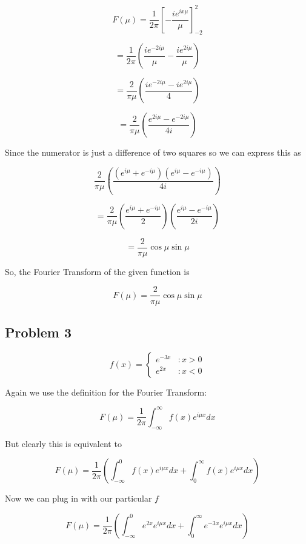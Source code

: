 \documentclass[12pt]{article}
\begin{document}
$$F(\mu)=\frac{1}{2\pi}\left[-\frac{i e^{i x \mu }}{\mu}\right]_{-2}^2$$

$$=\frac{1}{2\pi}\left(\frac{i e^{-2 i \mu }}{\mu }-\frac{i e^{2 i \mu }}{\mu }\right)$$

$$=\frac{2}{\pi\mu}\left(\frac{i e^{-2 i \mu }-i e^{2 i \mu }}{4 }\right)$$

$$=\frac{2}{\pi\mu}\left(\frac{e^{2 i \mu }- e^{-2 i \mu } }{4 i }\right)$$

Since the numerator is just a difference of two squares so we can express this as

$$\frac{2}{\pi\mu}\left(\frac{(e^{ i \mu }+ e^{- i \mu })(e^{ i \mu }- e^{- i \mu }) }{4 i }\right)$$

$$=\frac{2}{\pi\mu}\left(\frac{e^{ i \mu }+ e^{- i \mu }}{2 }\right)\left(\frac{e^{ i \mu }- e^{- i \mu } }{2i }\right)$$

$$=\frac{2}{\pi\mu}\cos{\mu}\sin{\mu}$$

So, the Fourier Transform of the given function is

$$F(\mu)=\frac{2}{\pi\mu}\cos{\mu}\sin{\mu}$$

\subsection{Problem 3}

 \begin{displaymath}
   f(x) = \left\{
     \begin{array}{lr}
       e^{-3x} & : x >0 \\
       e^{2x} & : x<0
     \end{array}
   \right.
	\end{displaymath} 

Again we use the definition for the Fourier Transform:

$$F ( \mu ) = \frac{1}{2\pi} \int_{-\infty}^\infty f(x) e^{i \mu x} dx$$

But clearly this is equivalent to 

\begin{equation}\label{split}
F ( \mu ) = \frac{1}{2\pi}\left( \int_{-\infty}^0 f(x) e^{i \mu x} dx+ \int_{0}^\infty f(x) e^{i \mu x} dx\right)
\end{equation}

Now we can plug in with our particular $f$

$$F ( \mu ) = \frac{1}{2\pi}\left( \int_{-\infty}^0 e^{2x} e^{i \mu x} dx+ \int_{0}^\infty e^{-3x} e^{i \mu x} dx\right)$$
\end{document}
